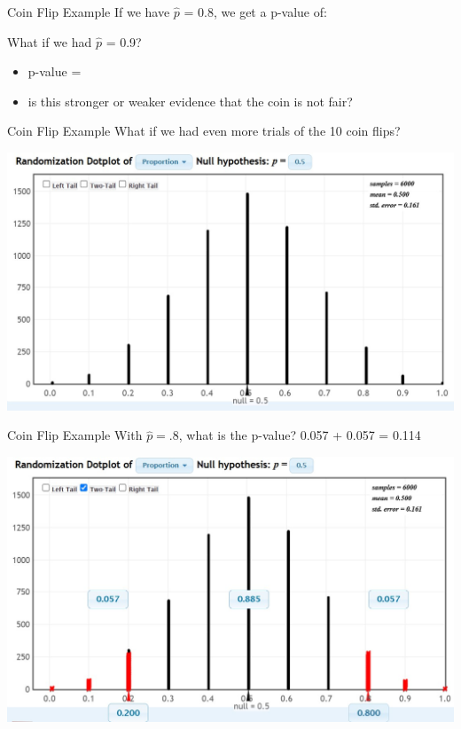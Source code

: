 \documentclass{beamer}
\begin{document}
\begin{frame}{Coin Flip Example}
If we have $\widehat{p}$ = 0.8, we get a p-value of: \vspace{6mm}

What if we had $\widehat{p}$ = 0.9?
\begin{itemize}
    \item p-value =
    \item is this stronger or weaker evidence that the coin is not fair?
\end{itemize}
\end{frame}

\begin{frame}{Coin Flip Example}
What if we had even more trials of the 10 coin flips?
\begin{center}
    \includegraphics[scale=.6]{img/coin_null_distr.jpg}
\end{center}
\end{frame}

\begin{frame}{Coin Flip Example}
With $\widehat{p} = .8$, what is the p-value? 0.057 + 0.057 =
0.114
\begin{center}
    \includegraphics[scale=.6]{img/coin_pvalue.jpg}
\end{center}
\end{frame}
\end{document}
